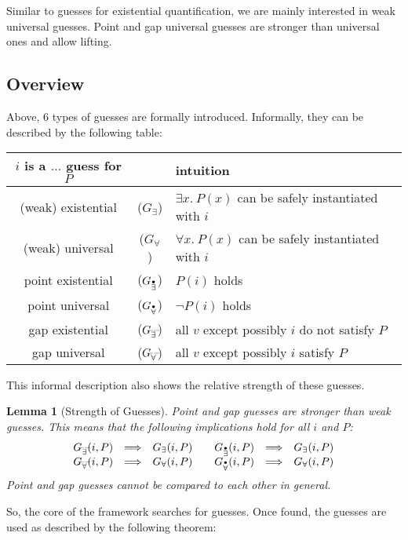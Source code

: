 \documentclass[a4paper,12pt,DIV=12,oneside]{scrbook}
\newtheorem{lemma}{Lemma}[section]
\theoremstyle{definition}
\theoremstyle{remark}
\newcommand{\GE}{\ensuremath{G_\exists}}
\newcommand{\GEP}{\ensuremath{G_{\accentset{\bullet}{\exists}}}}
\newcommand{\GEG}{\ensuremath{G_{\accentset{\_\,\_}{\exists}}}}
\newcommand{\GU}{\ensuremath{G_\forall}}
\newcommand{\GUP}{\ensuremath{G_{\accentset{\bullet}{\forall}}}}
\newcommand{\GUG}{\ensuremath{G_{\accentset{\_\,\_}{\forall}}}}
\begin{document}
Similar to guesses for existential quantification, we are mainly interested in weak universal guesses. Point and gap
universal guesses are stronger than universal ones and allow lifting. 


\subsection{Overview}

Above, 6 types of guesses are formally introduced. Informally, they can be described by the following table:
%
\begin{center}
\begin{tabular}{cc@{\quad}|@{\quad}l}
\textbf{$i$ is a $\ldots$ guess for $P$} &  & \textbf{intuition} \\\hline
(weak) existential & ($\GE$) & $\exists x.\ P(x)$ can be safely instantiated with $i$ \\
(weak) universal & ($\GU$) & $\forall x.\ P(x)$ can be safely instantiated with $i$ \\
point existential & ($\GEP$) & $P(i)$ holds \\
point universal & ($\GUP$) & $\neg P(i)$ holds \\
gap existential & ($\GEG$) & all $v$ except possibly $i$ do not satisfy $P$\\
gap universal & ($\GUG$) & all $v$ except possibly $i$ satisfy $P$\\
\end{tabular}
\end{center}
%
This informal description also shows the relative strength of these guesses.
%
\begin{lemma}[Strength of Guesses]\label{lemma_guesses_strength}%
Point and gap guesses are stronger than weak guesses. This means that the following
implications hold for all $i$ and $P$:
\[
\begin{array}{rcl@{\qquad}rcl}
  \GEG(i, P) & \Longrightarrow & \GE(i, P) &
  \GEP(i, P) & \Longrightarrow & \GE(i, P) \\
  \GUG(i, P) & \Longrightarrow & \GU(i, P) &
  \GUP(i, P) & \Longrightarrow & \GU(i, P)
\end{array}
\]
\noindent
Point and gap guesses cannot be compared to each other in general.
\end{lemma}

So, the core of the framework searches for guesses. Once found, the guesses are used as described by the following theorem:
\end{document}
